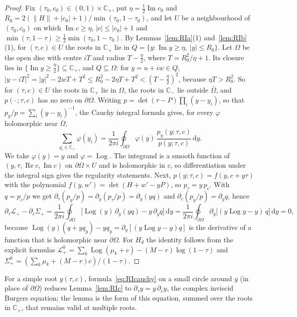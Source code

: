 \documentclass[11pt]{amsart}
\theoremstyle{definition}
\theoremstyle{remark}
\numberwithin{equation}{section}
\newcommand{\C}{\mathbb{C}}
\renewcommand{\Re}{\operatorname{Re}}
\renewcommand{\Im}{\operatorname{Im}}
\newcommand{\dd}{\,\mathrm{d}}
\begin{document}
\begin{proof}
Fix $(\tau_0,c_0)\in(0,1)\times\C_+$, put $\eta=\frac12\Im c_0$ and $R_0=2(\|H\|+|c_0|+1)/\min(\tau_0,1-\tau_0)$, and let
$U$ be a neighbourhood of $(\tau_0,c_0)$ on which $\Im c\ge\eta$, $|c|\le|c_0|+1$ and
$\min(\tau,1-\tau)\ge\frac12\min(\tau_0,1-\tau_0)$. By Lemmas~\ref{lem:RIa}(1) and~\ref{lem:RIb}(1), for $(\tau,c)\in U$ the
roots in $\C_+$ lie in $Q=\{y:\Im y\ge\eta,\ |y|\le R_0\}$. Let $\Omega$ be the open disc with centre $iT$ and radius
$T-\frac\eta2$, where $T=R_0^2/\eta+1$. Its closure lies in $\{\Im y\ge\frac\eta2\}\subseteq\C_+$, and $Q\subseteq\Omega$: for
$y=u+iw\in Q$, $|y-iT|^2=|y|^2-2wT+T^2\le R_0^2-2\eta T+T^2<(T-\frac\eta2)^2$, because $\eta T>R_0^2$. So for
$(\tau,c)\in U$ the roots in $\C_+$ lie in $\Omega$, the roots in $\C_-$ lie outside $\bar\Omega$, and $p(\cdot\,;\tau,c)$ has
no zero on $\partial\Omega$. Writing $p=\det(\tau-P)\prod_i(y-y_i)$, so that $p_y/p=\sum_i(y-y_i)^{-1}$, the Cauchy integral
formula gives, for every $\varphi$ holomorphic near $\bar\Omega$,
\begin{equation}\label{eq:RIcauchy}
\sum_{y_i\in\C_+}\varphi(y_i)=\frac1{2\pi i}\oint_{\partial\Omega}\varphi(y)\,\frac{p_y(y;\tau,c)}{p(y;\tau,c)}\dd y .
\end{equation}
We take $\varphi(y)=y$ and $\varphi=\operatorname{Log}$. The integrand is a smooth function of $(y,\tau,\Re c,\Im c)$ on
$\partial\Omega\times U$ and is holomorphic in $c$, so differentiation under the integral sign gives the regularity
statements. Next, $p(y;\tau,c)=f(y,c+y\tau)$ with the polynomial $f(y,w')=\det(H+w'-yP)$, so $p_\tau=y\,p_c$. With
$q=p_c/p$ we get $\partial_\tau(p_y/p)=\partial_y(p_\tau/p)=\partial_y(yq)$ and $\partial_c(p_y/p)=\partial_yq$, hence
\[
\partial_\tau\mathcal L_+-\partial_c\Sigma_+=\frac1{2\pi i}\oint_{\partial\Omega}\bigl[\operatorname{Log}(y)\,\partial_y(yq)-y\,\partial_yq\bigr]\dd y
=\frac1{2\pi i}\oint_{\partial\Omega}\partial_y\bigl[(y\operatorname{Log}y-y)\,q\bigr]\dd y=0,
\]
because $\operatorname{Log}(y)(q+yq_y)-yq_y=\partial_y[(y\operatorname{Log}y-y)q]$ is the derivative of a function that is
holomorphic near $\partial\Omega$. For $H_d$ the identity follows from the explicit formulas
$\mathcal L^0_+=\sum_k\operatorname{Log}(\mu_k+c)-(M-r)\log(1-\tau)$ and $\Sigma^0_+=(\sum_k\mu_k+(M-r)c)/(1-\tau)$.
\end{proof}

For a simple root $y(\tau,c)$, formula~\eqref{eq:RIcauchy} on a small circle around $y$ (in place of $\partial\Omega$) reduces Lemma~\ref{lem:RIc} to
$\partial_\tau y=y\,\partial_cy$, the complex inviscid Burgers equation; the lemma is the form of this equation, summed
over the roots in $\C_+$, that remains valid at multiple roots.
\end{document}
